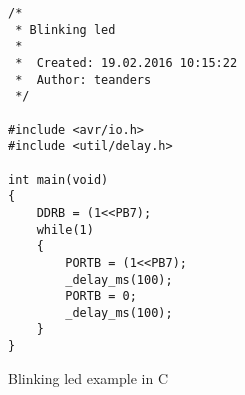 

\begin{figure}[ht]
    \caption{Blinking led example in C}
    \label{fig:blinkc}
\begin{lstlisting}
/*
 * Blinking led
 *
 *  Created: 19.02.2016 10:15:22
 *  Author: teanders
 */ 

#include <avr/io.h>
#include <util/delay.h>

int main(void)
{
    DDRB = (1<<PB7);
    while(1)
    {
        PORTB = (1<<PB7);
        _delay_ms(100);
        PORTB = 0;
        _delay_ms(100);
    }
}
\end{lstlisting}
\end{figure}